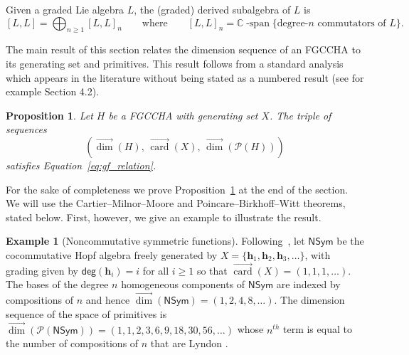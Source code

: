 \documentclass[11pt]{amsart}
\newtheorem{proposition}[theorem]{Proposition}
\theoremstyle{definition}
\newtheorem{example}[theorem]{Example}
\numberwithin{equation}{section}
\def\CC{{\mathbb C}}
\newcommand{\FGCCHA}{\textsf{FGCCHA}\xspace}
\newcommand{\vecdim}{\overrightarrow{\dim}}
\newcommand{\veccard}{\overrightarrow{\operatorname{card}}}
\begin{document}
Given a graded Lie algebra $L$, the (graded) derived subalgebra of $L$ is 
\begin{equation}
\label{eq:derivedLiesubalgebra}
[L, L] = \bigoplus_{n \ge 1} [L, L]_{n}
\qquad\text{where}\qquad
[L, L]_{n} = \CC\operatorname{-span}\{\text{degree-$n$ commutators of $L$}\}.
\end{equation}

The main result of this section relates the dimension sequence of an \FGCCHA to its generating set and primitives.
This result follows from a standard analysis which appears in the literature without being stated
as a numbered result (see for example \cite{AL15} Section 4.2).

\begin{proposition}
\label{prop:SequencesAsHopfStructures}
Let $H$ be a \FGCCHA with generating set $X$.  The triple of sequences
\[
\left(\vecdim(H), \,
\veccard(X),\,
\vecdim\left(\mathcal{P}(H)\right) \right)
\]
satisfies Equation~\eqref{eq:gf_relation}.
\end{proposition}


For the sake of completeness we prove Proposition~\ref{prop:SequencesAsHopfStructures} at the end of the section.  
We will use the Cartier--Milnor--Moore and Poincare--Birkhoff--Witt theorems, stated below.  
First, however,  we give an example to illustrate the result.  

\begin{example}[Noncommutative symmetric functions]
\label{ex:NSym}
Following~\cite{GKLLRT}, let $\mathsf{NSym}$ be the cocommutative Hopf algebra freely generated by $X = \{ \mathbf{h}_1, \mathbf{h}_2, \mathbf{h}_3, \ldots \}$, with grading given by $\mathsf{deg}(\mathbf{h}_{i}) = i$ for all $i \ge 1$ so that $\veccard(X) = (1, 1, 1, \ldots)$.  
The bases of the degree $n$ homogeneous components of $\mathsf{NSym}$ are indexed by compositions
of $n$ and hence $\vecdim(\mathsf{NSym}) = (1,2,4,8,\ldots)$.
The dimension sequence of the space of primitives is 
$\vecdim(\mathcal{P}(\mathsf{NSym})) = (1, 1, 2, 3, 6, 9, 18, 30, 56, \ldots)$
whose $n^{th}$ term is equal to the number
of compositions of $n$ that are Lyndon \cite{H07}.
\end{example}

\end{document}
